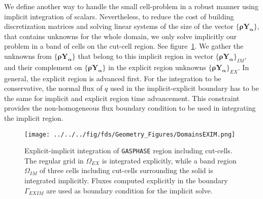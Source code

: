 \documentclass[12pt]{article}
\begin{document}
We define another way to handle the small cell-problem in a robust manner using implicit integration of scalars. Nevertheless, to reduce the cost of building discretization matrices and solving linear systems of the size of the vector $\{\mathbf{\rho Y_\alpha}\}$, that contains unknowns for the whole domain, we only solve implicitly our problem in a band of cells on the cut-cell region. See figure~\ref{Fig:DOMEXIM}. We gather the unknowns from  $\{\mathbf{\rho Y_\alpha}\}$ that belong to this implicit region in vector $\{\mathbf{\rho Y_\alpha}\}_{IM}$, and their complement on $\{\mathbf{\rho Y_\alpha}\}$ in the explicit region unknowns $\{\mathbf{\rho Y_\alpha}\}_{EX}$. In general, the explicit region is advanced first. For the integration to be conservative, the normal flux of $q$ used in the implicit-explicit boundary has to be the same for implicit and explicit region time advancement. This constraint provides the non-homogeneous flux boundary condition to be used in integrating the implicit region.

%
\begin{figure}[h]
      \centering
      \texttt{[image: ../../../fig/fds/Geometry\_Figures/DomainsEXIM.png]}
      \caption{Explicit-implicit integration of \texttt{GASPHASE} region including cut-cells. The regular grid in $\Omega_{EX}$ is integrated explicitly, while a band region $\Omega_{IM}$ of three cells including cut-cells surrounding the solid is integrated implicitly. Fluxes computed explicitly in the boundary $\Gamma_{EXIM}$ are used as boundary condition for the implicit solve.}
	\label{Fig:DOMEXIM}
\end{figure}
%
\end{document}
